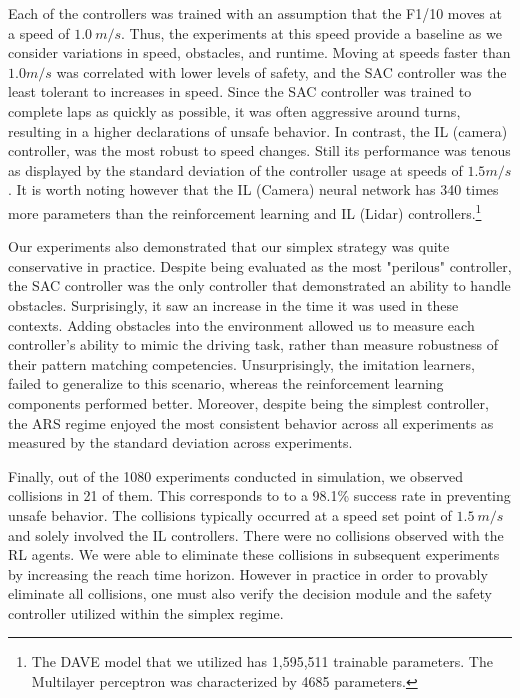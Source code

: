 \documentclass[manuscript,screen,review]{acmart}
\begin{document}


Each of the controllers was trained with an assumption that the F1/10 moves at a speed of $1.0 \ m/s$. Thus, the experiments at this speed provide a baseline as we consider variations in speed, obstacles, and runtime. Moving at speeds faster than $1.0 m/s$ was correlated with lower levels of safety, and the SAC controller was the least tolerant to increases in speed. Since the SAC controller was trained to complete laps as quickly as possible, it was often aggressive around turns, resulting in a higher declarations of unsafe behavior. In contrast, the IL (camera) controller, was the most robust to speed changes. Still its performance was tenous as displayed by the standard deviation of the controller usage at speeds of $1.5 m/s$. It is worth noting however that the IL (Camera) neural network has 340 times more parameters than the reinforcement learning and IL (Lidar) controllers.\footnote{The DAVE model that we utilized has 1,595,511 trainable parameters. The Multilayer perceptron was characterized by 4685 parameters.}


Our experiments also demonstrated that our simplex strategy was quite conservative in practice. Despite being evaluated as the most "perilous" controller, the SAC controller was the only controller that demonstrated an ability to handle obstacles. Surprisingly, it saw an increase in the time it was used in these contexts. Adding obstacles into the environment allowed us to measure each controller's ability to mimic the driving task, rather than measure robustness of their pattern matching competencies. Unsurprisingly, the imitation learners, failed to generalize to this scenario, whereas the reinforcement learning components performed better. Moreover, despite being the simplest controller, the ARS regime enjoyed the most consistent behavior across all experiments as measured by the standard deviation across experiments.

Finally, out of the 1080 experiments conducted in simulation, we observed collisions in 21 of them. This corresponds to to a 98.1\% success rate in preventing unsafe behavior. The collisions typically occurred at a speed set point of $1.5 \ m/s$ and solely involved the IL controllers. There were no collisions observed with the RL agents. We were able to eliminate these collisions in subsequent experiments by increasing the reach time horizon. However in practice in order to provably eliminate all collisions, one must also verify the decision module and the safety controller utilized within the simplex regime.
\end{document}
